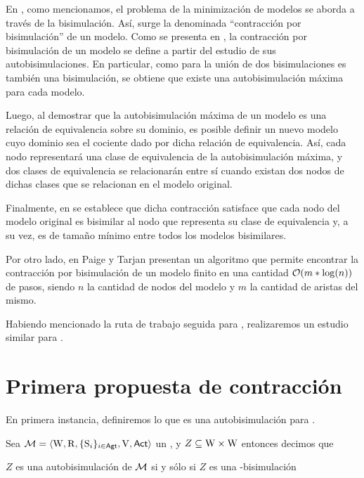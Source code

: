 En \bml, como mencionamos, el problema de la minimización de modelos se aborda a través de la bisimulación. Así, surge la denominada 
``contracción por bisimulación'' de un modelo.
Como se presenta en \cite[Capítulo 3]{HandbookModalLogic}, la contracción por bisimulación de un modelo se define a partir del estudio de 
sus autobisimulaciones. En particular, como para \bml la unión de dos bisimulaciones es también una bisimulación, se obtiene que existe 
una autobisimulación máxima para cada modelo.

Luego, al demostrar que la autobisimulación máxima de un modelo es una relación de equivalencia sobre su dominio, 
es posible definir un nuevo modelo cuyo dominio sea el cociente dado por dicha relación de equivalencia. Así, cada nodo representará 
una clase de equivalencia de la autobisimulación máxima, y dos clases de equivalencia se relacionarán entre sí cuando existan dos 
nodos de dichas clases que se relacionan en el modelo original.

Finalmente, en \cite{HandbookModalLogic} se establece que dicha contracción satisface que cada nodo del modelo original es bisimilar 
al nodo que representa su clase de equivalencia y, a su vez, es de tamaño mínimo entre todos los modelos bisimilares.

Por otro lado, en \cite{Paige&TarjanContraction} Paige y Tarjan presentan un algoritmo que permite encontrar la contracción por bisimulación de 
un modelo finito en una cantidad $\mathcal{O}(m * \log (n))$ de pasos, siendo $n$ la cantidad de nodos del modelo y $m$ la cantidad de aristas 
del mismo.

Habiendo mencionado la ruta de trabajo seguida para \bml, realizaremos un estudio similar para \KHilogic.

\section{Primera propuesta de contracción}

En primera instancia, definiremos lo que es una autobisimulación para \KHilogic.

\begin{definicion}
    Sea $\mathcal{M}=\langle \mathrm{W},\mathrm{R},\{ \mathrm{S}_i \}_{i \in {\rm \sf Agt}},\mathrm{V},{\rm \sf Act} \rangle$ un \ults, y $Z \subseteq \mathrm{W} \times \mathrm{W}$ entonces decimos que
    \begin{center}
        $Z$ es una autobisimulación de $\mathcal{M}$ si y sólo si $Z$ es una \KHilogic-bisimulación        
    \end{center}
\end{definicion}

